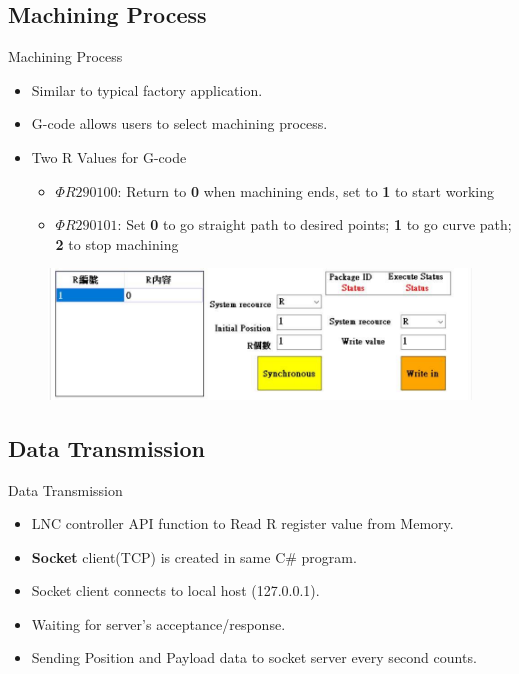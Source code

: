 \documentclass[11pt]{beamer}
\begin{document}
\subsection{Machining Process}
\begin{frame}{Machining Process}
  \begin{itemize}
    \item Similar to typical factory application.
    \item G-code allows users to select machining process.
    \item Two R Values for G-code
    \begin{itemize}
      \item ${\Phi R290100}$: Return to \textbf{0} when machining ends, set to \textbf{1} to start working
      \item ${\Phi R290101}$: Set \textbf{0} to go straight path to desired points; \textbf{1} to go curve path; \textbf{2} to stop machining
    \end{itemize} 
  \end{itemize}
  \begin{figure}
    \includegraphics[scale=0.3]{ui4.jpg}
  \end{figure}
\end{frame}

\subsection{Data Transmission}
\begin{frame}{Data Transmission}
  \begin{itemize}
    \item LNC controller API function to Read R register value from Memory.
    \item \textbf{Socket} client(TCP) is created in same C\# program.
    \item Socket client connects to local host (127.0.0.1).
    \item Waiting for server's acceptance/response.
    \item Sending Position and Payload data to socket server every second counts.
  \end{itemize}
\end{frame}
\end{document}
